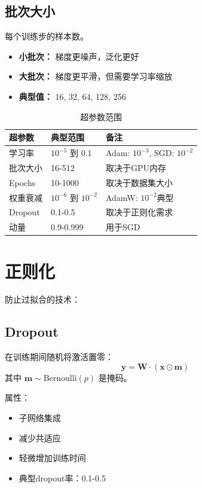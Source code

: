\subsection{批次大小}

每个训练步的样本数。

\begin{itemize}
    \item \textbf{小批次：} 梯度更噪声，泛化更好
    \item \textbf{大批次：} 梯度更平滑，但需要学习率缩放
    \item \textbf{典型值：} 16, 32, 64, 128, 256
\end{itemize}

\begin{table}[h]
    \centering
    \caption{超参数范围}
    \begin{tabular}{L{2.5cm} L{3cm} L{3.5cm}}
        \toprule
        \textbf{超参数} & \textbf{典型范围} & \textbf{备注} \\
        \midrule
        学习率 & $10^{-5}$ 到 $0.1$ & Adam: $10^{-3}$, SGD: $10^{-2}$ \\
        批次大小 & 16-512 & 取决于GPU内存 \\
        Epochs & 10-1000 & 取决于数据集大小 \\
        权重衰减 & $10^{-6}$ 到 $10^{-2}$ & AdamW: $10^{-2}$典型 \\
        Dropout & 0.1-0.5 & 取决于正则化需求 \\
        动量 & 0.9-0.999 & 用于SGD \\
        \bottomrule
    \end{tabular}
\end{table}

\section{正则化}

防止过拟合的技术：

\subsection{Dropout}

在训练期间随机将激活置零：
\begin{equation}
\mathbf{y} = \mathbf{W} \cdot (\mathbf{x} \odot \mathbf{m})
\end{equation}
其中 $\mathbf{m} \sim \text{Bernoulli}(p)$ 是掩码。

属性：
\begin{itemize}
    \item 子网络集成
    \item 减少共适应
    \item 轻微增加训练时间
    \item 典型dropout率：0.1-0.5
\end{itemize}

